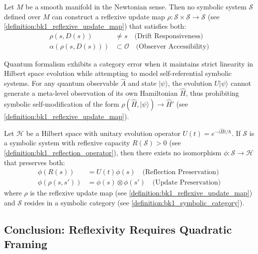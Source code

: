 \begin{proposition}
\label{prop:bk1_newtonian_incompleteness}
Let $M$ be a smooth manifold in the Newtonian sense. Then no symbolic system $\mathcal{S}$ defined over $M$ can construct a reflexive update map $\rho: \mathcal{S} \times \mathcal{S} \to \mathcal{S}$ (see \ref{definition:bk1_reflexive_update_map}) that satisfies both:
\begin{align}
\rho(s, D(s)) &\neq s \quad \text{(Drift Responsiveness)} \\
\alpha(\rho(s, D(s))) &\subset \mathcal{O} \quad \text{(Observer Accessibility)}
\end{align}
\end{proposition}

\begin{definition}
\label{definition:bk1_quantum_category_error}
Quantum formalism exhibits a category error when it maintains strict linearity in Hilbert space evolution while attempting to model self-referential symbolic systems. For any quantum observable $\hat{A}$ and state $|\psi\rangle$, the evolution $U|\psi\rangle$ cannot generate a meta-level observation of its own Hamiltonian $\hat{H}$, thus prohibiting symbolic self-modification of the form $\rho(\hat{H}, |\psi\rangle) \to \hat{H}'$ (see \ref{definition:bk1_reflexive_update_map}).
\end{definition}

\begin{lemma}
\label{lemma:bk1_symbolic_quantum_incompatibility}
Let $\mathcal{H}$ be a Hilbert space with unitary evolution operator $U(t)=e^{-i\hat{H}t/\hbar}$. If $\mathcal{S}$ is a symbolic system with reflexive capacity $R(\mathcal{S}) > 0$ (see \ref{definition:bk1_reflection_operator}), then there exists no isomorphism $\phi: \mathcal{S} \to \mathcal{H}$ that preserves both:
\begin{align}
\phi(R(s)) &= U(t)\phi(s) \quad \text{(Reflection Preservation)} \\
\phi(\rho(s, s')) &= \phi(s) \otimes \phi(s') \quad \text{(Update Preservation)}
\end{align}
where $\rho$ is the reflexive update map (see \ref{definition:bk1_reflexive_update_map}) and $\mathcal{S}$ resides in a symbolic category (see \ref{definition:bk1_symbolic_category}).
\end{lemma}

\subsection{Conclusion: Reflexivity Requires Quadratic Framing}
\label{subsec:bk1_reflexivity_requires_quadratic_framing}

